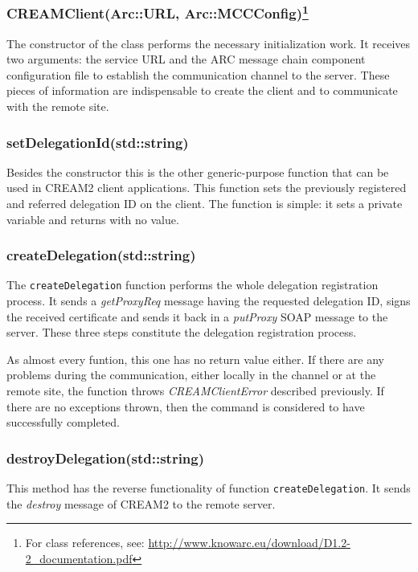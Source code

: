 \documentclass{article}
\begin{document}
\subsubsection*{CREAMClient(Arc::URL, Arc::MCCConfig)\footnote{For class references, see: \url{http://www.knowarc.eu/download/D1.2-2\_documentation.pdf}}}
The constructor of the class performs the necessary initialization work. It receives two arguments: the service URL and the ARC message chain component configuration file to establish the communication channel to the server. These pieces of information are indispensable to create the client and to communicate with the remote site.

\subsubsection*{setDelegationId(std::string)}
Besides the constructor this is the other generic-purpose function that can be used in CREAM2 client applications. This function sets the previously registered and referred delegation ID on the client. The function is simple: it sets a private variable and returns with no value.

\subsubsection*{createDelegation(std::string)}
The \texttt{createDelegation} function performs the whole delegation registration process. It sends a \textit{getProxyReq} message having the requested delegation ID, signs the received certificate and sends it back in a \textit{putProxy} SOAP message to the server. These three steps constitute the delegation registration process.

As almost every funtion, this one has no return value either. If there are any problems during the communication, either locally in the channel or at the remote site, the function throws \textit{CREAMClientError} described previously. If there are no exceptions thrown, then the command is considered to have successfully completed.

\subsubsection*{destroyDelegation(std::string)}
This method has the reverse functionality of function \texttt{createDelegation}. It sends the \textit{destroy} message of CREAM2 to the remote server.
\end{document}
